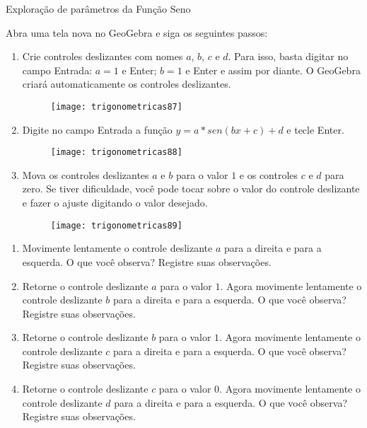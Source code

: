 \begin{task}{Exploração de parâmetros da Função Seno}
\label{trig-ativ18}

Abra uma tela nova no GeoGebra e siga os seguintes passos:

\begin{enumerate}[label=\titem{\arabic*.}, left=0pt]
\item Crie controles deslizantes com nomes $a$, $b$, $c$ e $d$. Para isso, basta digitar no campo Entrada: $a=1$ e Enter; $b=1$ e Enter e assim por diante. O GeoGebra criará automaticamente os controles deslizantes.
  \begin{figure}[H]
  \centering
  
  \texttt{[image: trigonometricas87]}
  \end{figure}

\newpage
\item Digite no campo Entrada a função $y = a*sen(bx+c)+d$ e tecle Enter.
\begin{figure}[H]
  \centering
  
  \texttt{[image: trigonometricas88]}
  \end{figure}
 
\item Mova os controles deslizantes $a$ e $b$ para o valor $1$ e os controles $c$ e $d$ para zero. Se tiver dificuldade, você pode tocar sobre o valor do controle deslizante e fazer o ajuste digitando o valor desejado.
\begin{figure}[H]
  \centering
  
  \texttt{[image: trigonometricas89]}
  \end{figure}

\end{enumerate}
 
\begin{enumerate}
\item Movimente lentamente o controle deslizante $a$ para a direita e para a esquerda. O que você observa? Registre suas observações. 
\item Retorne o controle deslizante $a$ para o valor $1$. Agora movimente lentamente o controle deslizante $b$ para a direita e para a esquerda. O que você observa? Registre suas observações.
\item Retorne o controle deslizante $b$ para o valor $1$. Agora movimente lentamente o controle deslizante $c$ para a direita e para a esquerda. O que você observa? Registre suas observações.
\item Retorne o controle deslizante $c$ para o valor $0$. Agora movimente lentamente o controle deslizante $d$ para a direita e para a esquerda. O que você observa? Registre suas observações.
\end{enumerate}

\end{task}

